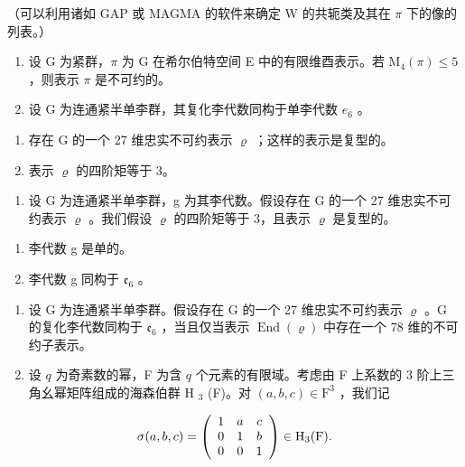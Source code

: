 （可以利用诸如 GAP 或 MAGMA 的软件来确定 W 的共轭类及其在 \(\pi\) 下的像的列表。）

\begin{enumerate}
\def\labelenumi{\arabic{enumi})}
\setcounter{enumi}{10}
\item
  设 G 为紧群，\(\pi\) 为 G 在希尔伯特空间 E 中的有限维酉表示。若 \(\mathrm{M}_{4}(\pi) \leqslant 5\) ，则表示 \(\pi\) 是不可约的。
\item
  设 G 为连通紧半单李群，其复化李代数同构于单李代数 \(e_{6}\) 。
\end{enumerate}

\begin{enumerate}
\def\labelenumi{\alph{enumi})}
\item
  存在 G 的一个 27 维忠实不可约表示 \(\varrho\) ；这样的表示是复型的。
\item
  表示 \(\varrho\) 的四阶矩等于 3。
\end{enumerate}

\begin{enumerate}
\def\labelenumi{\arabic{enumi})}
\setcounter{enumi}{12}
\tightlist
\item
  设 G 为连通紧半单李群，g 为其李代数。假设存在 G 的一个 27 维忠实不可约表示 \(\varrho\) 。我们假设 \(\varrho\) 的四阶矩等于 3，且表示 \(\varrho\) 是复型的。
\end{enumerate}

\begin{enumerate}
\def\labelenumi{\alph{enumi})}
\item
  李代数 g 是单的。
\item
  李代数 g 同构于 \(\mathfrak{e}_{6}\) 。
\end{enumerate}

\begin{enumerate}
\def\labelenumi{\arabic{enumi})}
\setcounter{enumi}{13}
\item
  设 G 为连通紧半单李群。假设存在 G 的一个 27 维忠实不可约表示 \(\varrho\) 。G 的复化李代数同构于 \(\mathfrak{e}_6\) ，当且仅当表示 \(\operatorname{End}(\varrho)\) 中存在一个 78 维的不可约子表示。
\item
  设 \(q\) 为奇素数的幂，F 为含 \(q\) 个元素的有限域。考虑由 F 上系数的 3 阶上三角幺幂矩阵组成的海森伯群 H \(_3\) (F)。对 \((a, b, c) \in \mathrm{F}^3\) ，我们记
\end{enumerate}

\[
\sigma (a, b, c) = \left( \begin{array}{c c c} 1 & a & c \\ 0 & 1 & b \\ 0 & 0 & 1 \end{array} \right) \in \mathrm{H} _ {3} (\mathrm{F}).
\]

